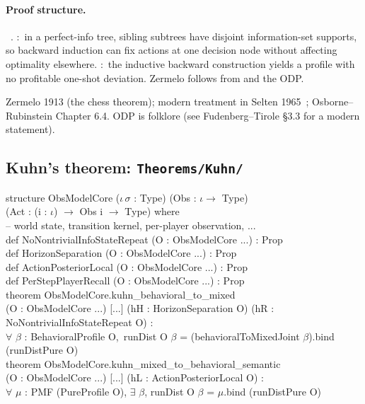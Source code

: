 \paragraph{Proof structure.}\
.
:\ in a perfect-info tree,
sibling subtrees have disjoint information-set supports, so
backward induction can fix actions at one decision node without
affecting optimality elsewhere.  :\ the inductive
backward construction yields a profile with no profitable one-shot
deviation.  Zermelo follows from \TT{exists_noOSD} and the ODP.

\Textbook
Zermelo 1913 (the chess theorem); modern treatment in
Selten 1965~\citep{Selten1965, Selten1975}; Osborne–Rubinstein
Chapter 6.4.  ODP is folklore (see Fudenberg–Tirole §3.3 for a
modern statement).

\subsection{Kuhn's theorem: \texttt{Theorems/Kuhn/}}
\label{sec:supp:kuhn}\label{def:ObsModelCore}\label{def:kuhn_behavioral_to_mixed}\label{def:kuhn_mixed_to_behavioral_semantic}

\begin{leanbox}
structure ObsModelCore ($\iota\,\sigma$ : Type) (Obs : $\iota \to$ Type)\\
\bd (Act : (i : $\iota$) $\to$ Obs i $\to$ Type) where\\
\bd  -- world state, transition kernel, per-player observation, ...\\[3pt]
def NoNontrivialInfoStateRepeat (O : ObsModelCore ...) : Prop\\
def HorizonSeparation                (O : ObsModelCore ...) : Prop\\
def ActionPosteriorLocal            (O : ObsModelCore ...) : Prop\\
def PerStepPlayerRecall             (O : ObsModelCore ...) : Prop\\[3pt]
theorem ObsModelCore.kuhn\_behavioral\_to\_mixed\\
\bd (O : ObsModelCore ...) [...] (hH : HorizonSeparation O) (hR : NoNontrivialInfoStateRepeat O) :\\
\bd $\forall$ $\beta$ : BehavioralProfile O,\ runDist O $\beta$ = (behavioralToMixedJoint $\beta$).bind (runDistPure O)\\[3pt]
theorem ObsModelCore.kuhn\_mixed\_to\_behavioral\_semantic\\
\bd (O : ObsModelCore ...) [...] (hL : ActionPosteriorLocal O) :\\
\bd $\forall$ $\mu$ : PMF (PureProfile O), $\exists$ $\beta$, runDist O $\beta$ = $\mu$.bind (runDistPure O)
\end{leanbox}

